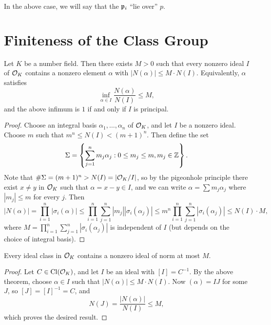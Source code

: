 \begin{remark}
  In the above case, we will say that the
  $\mathfrak{p}_i$ ``lie over'' $p$.
\end{remark}

\section{Finiteness of the Class Group}
\begin{theorem}
  Let $K$ be a number field. Then there exists $M > 0$
  such that every nonzero ideal $I$ of $\mathcal{O}_K$ contains
  a nonzero element $\alpha$ with
  $|N(\alpha)| \le M \cdot N(I)$. Equivalently,
  $\alpha$ satisfies
  \[
    \inf_{\alpha \in I} \frac{N(\alpha)}{N(I)} \le M,
  \]
  and the above infimum is $1$ if and only if $I$ is
  principal.
\end{theorem}

\begin{proof}
  Choose an integral basis $\alpha_1, \dots, \alpha_n$
  of $\mathcal{O}_K$, and let $I$ be a nonzero ideal.
  Choose $m$ such that $m^n \le N(I) < (m + 1)^n$.
  Then define the set
  \[
    \Sigma =
    \left\{
      \sum_{j = 1}^n m_j \alpha_j : 0 \le m_j \le m, m_j \in \mathbb{Z}
    \right\}.
  \]
  Note that $\# \Sigma = (m + 1)^n > N(I) = |\mathcal{O}_K / I|$,
  so by the pigeonhole principle there exist $x \ne y$
  in $\mathcal{O}_K$ such that $\alpha = x - y \in I$, and
  we can write $\alpha = \sum m_j \alpha_j$ where
  $|m_j| \le m$ for every $j$. Then
  \[
    |N(\alpha)| = \prod_{i = 1}^n |\sigma_i(\alpha)|
    \le \prod_{i = 1}^n \sum_{j = 1}^n |m_j| |\sigma_i(\alpha_j)|
    \le m^n \prod_{i = 1}^n \sum_{j = 1}^n |\sigma_i(\alpha_j)|
    \le N(I) \cdot M,
  \]
  where $M = \prod_{i = 1}^n \sum_{j = 1}^n |\sigma_i(\alpha_j)|$
  is independent of $I$ (but depends on the
  choice of integral basis).
\end{proof}

\begin{corollary}
  Every ideal class in $\mathcal{O}_K$ contains a nonzero
  ideal of norm at most $M$.
\end{corollary}

\begin{proof}
  Let $C \in \operatorname{Cl}(\mathcal{O}_K)$, and let $I$ be an ideal
  with $[I] = C^{-1}$. By the above theorem,
  choose $\alpha \in I$ such that $|N(\alpha)| \le M \cdot N(I)$.
  Now $(\alpha) = IJ$ for some $J$, so
  $[J] = [I]^{-1} = C$, and
  \[
    N(J) = \frac{|N(\alpha)|}{N(I)} \le M,
  \]
  which proves the desired result.
\end{proof}

